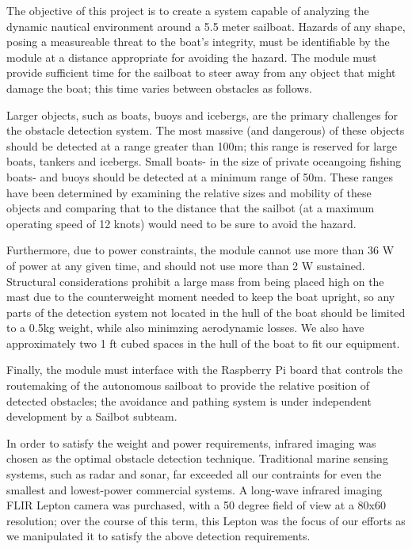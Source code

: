 The objective of this project is to create a system capable of analyzing the dynamic nautical environment around a 5.5 meter sailboat. Hazards of any shape, posing a measureable threat to the boat's integrity, must be identifiable by the module at a distance appropriate for avoiding the hazard. The module must provide sufficient time for the sailboat to steer away from any object that might damage the boat; this time varies between obstacles as follows.

Larger objects, such as boats, buoys and icebergs, are the primary challenges for the obstacle detection system. The most massive (and dangerous) of these objects should be detected at a range greater than 100m; this range is reserved for large boats, tankers and icebergs. Small boats- in the size of private oceangoing fishing boats- and buoys should be detected at a minimum range of 50m. These ranges have been determined by examining the relative sizes and mobility of these objects and comparing that to the distance that the sailbot (at a maximum operating speed of 12 knots) would need to be sure to avoid the hazard.

Furthermore, due to power constraints, the module cannot use more than 36 W of power at any given time, and should not use more than 2 W sustained. Structural considerations prohibit a large mass from being placed high on the mast due to the counterweight moment needed to keep the boat upright, so any parts of the detection system not located in the hull of the boat should be limited to a 0.5kg weight, while also minimzing aerodynamic losses. We also have approximately two 1 ft cubed spaces in the hull of the boat to fit our equipment. 

Finally, the module must interface with the Raspberry Pi board that controls the routemaking of the autonomous sailboat to provide the relative position of detected obstacles; the avoidance and pathing system is under independent development by a Sailbot subteam.

In order to satisfy the weight and power requirements, infrared imaging was chosen as the optimal obstacle detection technique. Traditional marine sensing systems, such as radar and sonar, far exceeded all our contraints for even the smallest and lowest-power commercial systems. A long-wave infrared imaging FLIR Lepton camera was purchased, with a 50 degree field of view at a 80x60 resolution; over the course of this term, this Lepton was the focus of our efforts as we manipulated it to satisfy the above detection requirements.

